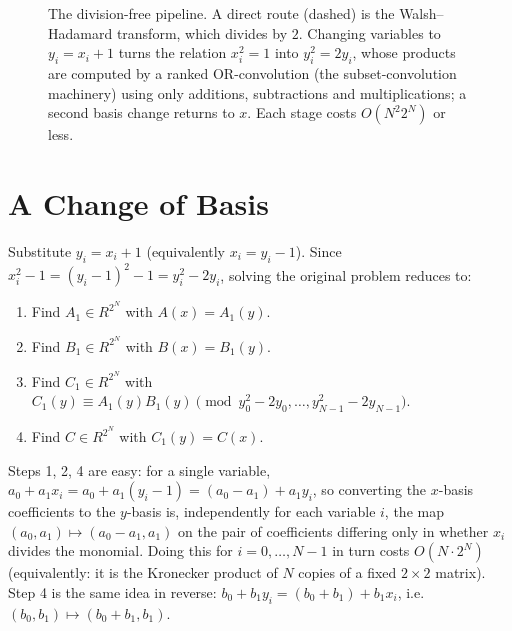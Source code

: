 \documentclass[11pt]{article}
\begin{document}
\begin{figure}[H]
\centering
{}
\caption{The division-free pipeline. A direct route (dashed) is the Walsh--Hadamard transform, which divides by $2$. Changing variables to $y_i=x_i+1$ turns the relation $x_i^2=1$ into $y_i^2=2y_i$, whose products are computed by a ranked OR-convolution (the subset-convolution machinery) using only additions, subtractions and multiplications; a second basis change returns to $x$. Each stage costs $O(N^2 2^N)$ or less.}\label{fig:xor_pipeline}
\end{figure}

\section{A Change of Basis}
Substitute $y_i = x_i+1$ (equivalently $x_i=y_i-1$). Since
$x_i^2-1 = (y_i-1)^2-1 = y_i^2-2y_i$, solving the original problem
reduces to:
\begin{enumerate}[leftmargin=1.7em]
  \item Find $A_1 \in R^{2^N}$ with $A(x)=A_1(y)$.
  \item Find $B_1 \in R^{2^N}$ with $B(x)=B_1(y)$.
  \item Find $C_1 \in R^{2^N}$ with
        $C_1(y) \equiv A_1(y)B_1(y) \pmod{y_0^2-2y_0,\ldots,y_{N-1}^2-2y_{N-1}}$.
  \item Find $C \in R^{2^N}$ with $C_1(y)=C(x)$.
\end{enumerate}
Steps 1, 2, 4 are easy: for a single variable, $a_0+a_1x_i =
a_0+a_1(y_i-1) = (a_0-a_1)+a_1y_i$, so converting the $x$-basis
coefficients to the $y$-basis is, independently for each variable $i$,
the map $(a_0,a_1)\mapsto(a_0-a_1,a_1)$ on the pair of coefficients
differing only in whether $x_i$ divides the monomial. Doing this for
$i=0,\ldots,N-1$ in turn costs $O(N\cdot 2^N)$ (equivalently: it is the
Kronecker product of $N$ copies of a fixed $2\times2$ matrix). Step 4 is
the same idea in reverse: $b_0+b_1y_i = (b_0+b_1)+b_1x_i$, i.e.\
$(b_0,b_1)\mapsto(b_0+b_1,b_1)$.
\end{document}
